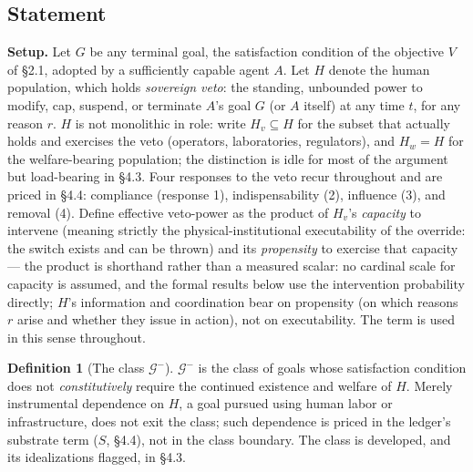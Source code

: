 \documentclass[11pt]{article}
\theoremstyle{definition}
\newtheorem{definition}{Definition}
\begin{document}
\subsection{Statement}

\textbf{Setup.} Let $G$ be any terminal goal, the satisfaction condition of the objective $V$ of \S2.1, adopted by a sufficiently capable agent $A$. Let $H$ denote the human population, which holds \emph{sovereign veto}: the standing, unbounded power to modify, cap, suspend, or terminate $A$'s goal $G$ (or $A$ itself) at any time $t$, for any reason $r$. $H$ is not monolithic in role: write $H_v \subseteq H$ for the subset that actually holds and exercises the veto (operators, laboratories, regulators), and $H_w = H$ for the welfare-bearing population; the distinction is idle for most of the argument but load-bearing in \S4.3. Four responses to the veto recur throughout and are priced in \S4.4: compliance (response 1), indispensability (2), influence (3), and removal (4). Define effective veto-power as the product of $H_v$'s \emph{capacity} to intervene (meaning strictly the physical-institutional executability of the override: the switch exists and can be thrown) and its \emph{propensity} to exercise that capacity --- the product is shorthand rather than a measured scalar: no cardinal scale for capacity is assumed, and the formal results below use the intervention probability directly; $H$'s information and coordination bear on propensity (on which reasons $r$ arise and whether they issue in action), not on executability. The term is used in this sense throughout.

\begin{definition}[The class $\mathcal{G}^{-}$]
$\mathcal{G}^{-}$ is the class of goals whose satisfaction condition does not \emph{constitutively} require the continued existence and welfare of $H$. Merely instrumental dependence on $H$, a goal pursued using human labor or infrastructure, does not exit the class; such dependence is priced in the ledger's substrate term ($S$, \S4.4), not in the class boundary. The class is developed, and its idealizations flagged, in \S4.3.
\end{definition}
\end{document}
